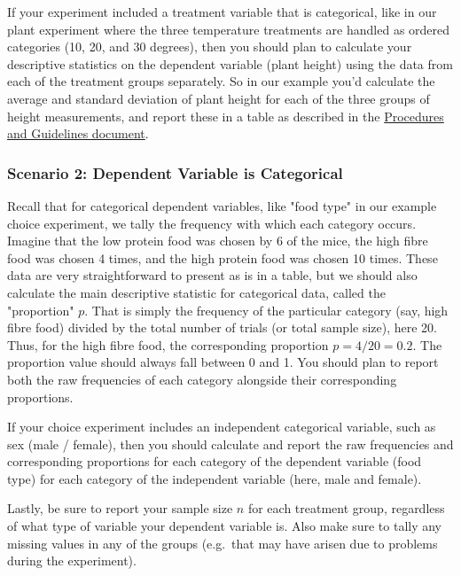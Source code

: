\documentclass[
]{book}
\begin{document}
If your experiment included a treatment variable that is categorical, like in our plant experiment where the three temperature treatments are handled as ordered categories (10, 20, and 30 degrees), then you should plan to calculate your descriptive statistics on the dependent variable (plant height) using the data from each of the treatment groups separately. So in our example you'd calculate the average and standard deviation of plant height for each of the three groups of height measurements, and report these in a table as described in the \href{https://ubco-biology.github.io/Procedures-and-Guidelines/descriptive-summary-statistics.html\%22HYPERLINK\%20\%22https://pages.learning.github.ubc.ca/vdunbar/Procedural-Documents/biology-guidelines-for-data-presentation.html}{Procedures and Guidelines document}.

\hypertarget{scenario-2-dependent-variable-is-categorical}{%
\subsubsection*{Scenario 2: Dependent Variable is Categorical}\label{scenario-2-dependent-variable-is-categorical}}

Recall that for categorical dependent variables, like "food type" in our example choice experiment, we tally the frequency with which each category occurs. Imagine that the low protein food was chosen by 6 of the mice, the high fibre food was chosen 4 times, and the high protein food was chosen 10 times. These data are very straightforward to present as is in a table, but we should also calculate the main descriptive statistic for categorical data, called the "proportion" \(p\). That is simply the frequency of the particular category (say, high fibre food) divided by the total number of trials (or total sample size), here 20. Thus, for the high fibre food, the corresponding proportion \(p = 4/20 = 0.2\). The proportion value should always fall between 0 and 1. You should plan to report both the raw frequencies of each category alongside their corresponding proportions.

If your choice experiment includes an independent categorical variable, such as sex (male / female), then you should calculate and report the raw frequencies and corresponding proportions for each category of the dependent variable (food type) for each category of the independent variable (here, male and female).

Lastly, be sure to report your sample size \(n\) for each treatment group, regardless of what type of variable your dependent variable is. Also make sure to tally any missing values in any of the groups (e.g.~that may have arisen due to problems during the experiment).
\end{document}
